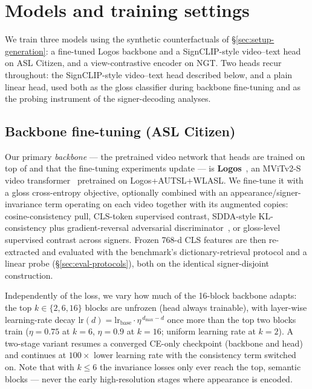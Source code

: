 \section{Models and training settings}
\label{sec:setup-training}
We train three models using the synthetic counterfactuals of
\S\ref{sec:setup-generation}: a fine-tuned Logos backbone and a
SignCLIP-style video--text head on ASL Citizen, and a view-contrastive
encoder on NGT. Two heads recur throughout: the SignCLIP-style
video--text head described below, and a plain linear head, used both as
the gloss classifier during backbone fine-tuning and as the probing
instrument of the signer-decoding analyses.

\subsection{Backbone fine-tuning (ASL Citizen)}
Our primary \emph{backbone} --- the pretrained video network that heads
are trained on top of and that the fine-tuning experiments update --- is
\textbf{Logos}~\cite{ovodovLogosWellTemperedPretrain2025}, an MViTv2-S
video transformer~\cite{liMViTv2ImprovedMultiscale2022} pretrained on
Logos+AUTSL+WLASL. We fine-tune it with a gloss cross-entropy objective,
optionally combined with an appearance/signer-invariance term operating
on each video together with its augmented copies: cosine-consistency
pull, CLS-token supervised contrast, SDDA-style KL-consistency plus
gradient-reversal adversarial
discriminator~\cite{fuSignerDiversitydrivenData2024b}, or gloss-level
supervised contrast across signers. Frozen 768-d CLS features are then
re-extracted and evaluated with the benchmark's dictionary-retrieval
protocol and a linear probe (\S\ref{sec:eval-protocols}), both on the
identical signer-disjoint construction.

Independently of the loss, we vary how much of the 16-block backbone
adapts: the top $k \in \{2, 6, 16\}$ blocks are unfrozen (head always
trainable), with layer-wise learning-rate decay
$\mathrm{lr}(d) = \mathrm{lr}_{\mathrm{base}} \cdot \eta^{\,d_{\max}-d}$
once more than the top two blocks train ($\eta = 0.75$ at $k{=}6$,
$\eta = 0.9$ at $k{=}16$; uniform learning rate at $k{=}2$). A two-stage
variant resumes a
converged CE-only checkpoint (backbone and head) and continues at
$100\times$ lower learning rate with the consistency term switched on. Note
that with $k \leq 6$ the invariance losses only ever reach the top,
semantic blocks --- never the early high-resolution stages where
appearance is encoded.

